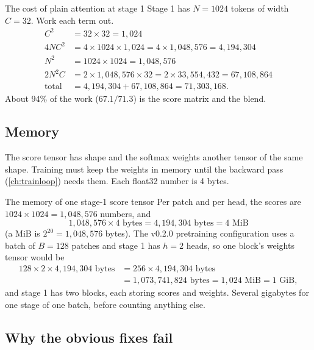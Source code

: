 \begin{worked}[label={we:esa:plaincost}]{The cost of plain attention at stage 1}
Stage 1 has $N = 1024$ tokens of width $C = 32$. Work each term out.
\begin{align*}
  C^2 &= 32\times32 = 1{,}024\\
  4NC^2 &= 4\times1024\times1{,}024 = 4\times1{,}048{,}576 = 4{,}194{,}304\\
  N^2 &= 1024\times1024 = 1{,}048{,}576\\
  2N^2C &= 2\times1{,}048{,}576\times32 = 2\times33{,}554{,}432 = 67{,}108{,}864\\
  \text{total} &= 4{,}194{,}304 + 67{,}108{,}864 = 71{,}303{,}168 .
\end{align*}
About 94\% of the work ($67.1/71.3$) is the score matrix and the blend.
\end{worked}

\subsection{Memory}

The score tensor has shape  and the softmax weights another tensor of the same
shape. Training must keep the weights in memory until the backward pass (\cref{ch:trainloop})
needs them. Each float32 number is 4 bytes.

\begin{worked}[label={we:esa:plainmem}]{The memory of one stage-1 score tensor}
Per patch and per head, the scores are $1024\times1024 = 1{,}048{,}576$ numbers, and
\[
  1{,}048{,}576 \times 4 \text{ bytes} = 4{,}194{,}304 \text{ bytes} = 4 \text{ MiB}
\]
(a MiB is $2^{20} = 1{,}048{,}576$ bytes). The v0.2.0 pretraining configuration uses a batch of
$B = 128$ patches and stage 1 has $h = 2$ heads,
so one block's weights tensor would be
\begin{align*}
  128 \times 2 \times 4{,}194{,}304 \text{ bytes} &= 256 \times 4{,}194{,}304 \text{ bytes}\\
  &= 1{,}073{,}741{,}824 \text{ bytes} = 1{,}024 \text{ MiB} = 1 \text{ GiB},
\end{align*}
and stage 1 has two blocks, each storing scores and weights. Several gigabytes for one stage of
one batch, before counting anything else.
\end{worked}

\subsection{Why the obvious fixes fail}

